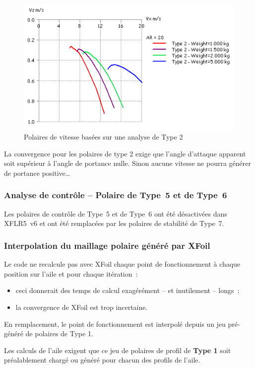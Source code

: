 \documentclass[a4paper,twoside,12pt,dvips]{article}
\begin{document}
\begin{figure}[htbp]
  \centering
  \includegraphics[width=0.8\linewidth]{img-34}
  \caption{Polaires de vitesse basées sur une analyse de Type 2}
  \label{img:polaire_vitesse_analyse_type_2}
\end{figure}

La convergence pour les polaires de type 2 exige que l’angle d’attaque 
apparent soit supérieur à l’angle de portance nulle. Sinon aucune vitesse
ne pourra générer de portance positive\dots

\subsubsection{Analyse de contrôle – Polaire de Type~5 et de Type~6}

Les polaires de contrôle de Type~5 et de Type~6 ont été désactivées dans
XFLR5~v6 et ont été remplacées par les polaires de stabilité de Type~7.

\subsubsection{Interpolation du maillage polaire généré par XFoil}
Le code ne recalcule pas avec XFoil chaque point de fonctionnement à chaque 
position sur l’aile et pour chaque itération~: 
\begin{itemize}
	\item ceci donnerait des temps de calcul exagérément – et inutilement – 
	longs~;
	\item la convergence de XFoil est trop incertaine.
\end{itemize}

En remplacement, le point de fonctionnement est interpolé depuis un jeu 
pré-généré de polaires de Type 1.

Les calculs de l’aile exigent que ce jeu de polaires de profil de \textbf{Type 1} soit préalablement chargé ou généré pour chacun des profils de l’aile.
\end{document}
